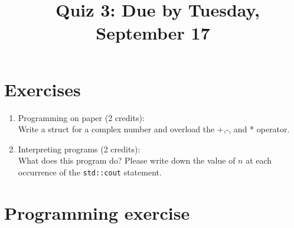 \documentclass[11pt]{article}
\begin{document}
\title{\coursename~Quiz 3: Due by Tuesday, September 17}
\date{}
\maketitle

\medskip


\section*{Exercises}

\begin{enumerate}
\item Programming on paper (2 credits): \\
Write a struct for a complex number and overload the +,-, and * operator.

\item Interpreting programs (2 credits): \\
What does this program do? Please write down the value of $n$ at each occurrence of the \lstinline|std::cout| statement.



\end{enumerate}

\section*{Programming exercise}
\end{document}
